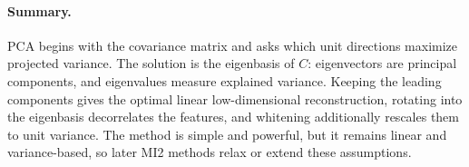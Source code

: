 \paragraph{Summary.}
PCA begins with the covariance matrix and asks which unit directions maximize projected variance. The solution is the eigenbasis of $C$: eigenvectors are principal components, and eigenvalues measure explained variance. Keeping the leading components gives the optimal linear low-dimensional reconstruction, rotating into the eigenbasis decorrelates the features, and whitening additionally rescales them to unit variance. The method is simple and powerful, but it remains linear and variance-based, so later MI2 methods relax or extend these assumptions.
